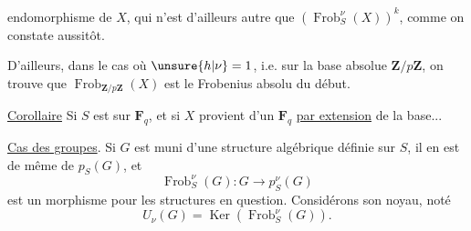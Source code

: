 endomorphisme de $X$, qui n'est d'ailleurs autre que
$(\operatorname{Frob}_S^\nu(X))^k$, comme on constate aussitôt.

D'ailleurs, dans le cas où $\unsure{h|\nu}=1$, i.e.
sur la base absolue $\mathbf Z/p\mathbf Z$, on trouve que
$\operatorname{Frob}_{\mathbf Z/p\mathbf Z}(X)$ est le Frobenius absolu du début.

\uline{Corollaire} Si $S$ est sur $\mathbf F_q$, et si $X$ provient d'un
  $\mathbf F_q$ \uline{par extension} de la base...

\uline{Cas des groupes}. Si $G$ est muni d'une
structure algébrique définie sur $S$, il en est
de même de $p_S(G)$, et 
\[
\operatorname{Frob}_S^\nu(G):G\longrightarrow p_S^\nu(G)
\]
est un morphisme pour les structures en question.
Considérons son noyau, noté
\[
U_\nu(G)=\operatorname{Ker}(\operatorname{Frob}_S^\nu(G)).
\]
